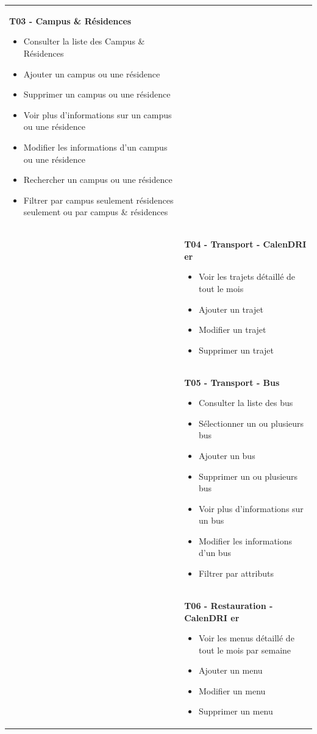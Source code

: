 \begin{longtable}{|Z{3cm}|L{10cm}|}
    \textbf{T03 - Campus \& Résidences}
    \begin{itemize}
        \item Consulter la liste des Campus \& Résidences
        \item Ajouter un campus ou une résidence
        \item Supprimer un campus ou une résidence
        \item Voir plus d'informations sur un campus ou une résidence
        \item Modifier les informations d'un campus ou une résidence
        \item Rechercher un campus ou une résidence
        \item Filtrer par campus seulement résidences seulement ou par campus \& résidences
    \end{itemize}\\
    &
    \textbf{T04 - Transport - Calen\acs{DRI} er}
    \begin{itemize}
        \item Voir les trajets détaillé de tout le mois
        \item Ajouter un trajet
        \item Modifier un trajet
        \item Supprimer un trajet
    \end{itemize}\\
    &
    \textbf{T05 - Transport - Bus}
    \begin{itemize}
        \item Consulter la liste des bus
        \item Sélectionner un ou plusieurs bus
        \item Ajouter un bus
        \item Supprimer un ou plusieurs bus
        \item Voir plus d'informations sur un bus
        \item Modifier les informations d'un bus
        \item Filtrer par attributs
    \end{itemize}\\
    &
    \textbf{T06 - Restauration - Calen\acs{DRI} er}
    \begin{itemize}
        \item Voir les menus détaillé de tout le mois par semaine
        \item Ajouter un menu
        \item Modifier un menu
        \item Supprimer un menu

\end{itemize}
\end{longtable}
